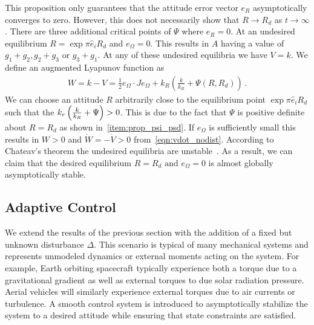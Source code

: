 \documentclass[letterpaper, 10 pt, conference]{ieeeconf}  %
\begin{document}
This proposition only guarantees that the attitude error vector \( e_R \) asymptotically converges to zero.
However, this does not necessarily show that \( R \to R_d \) as \( t \to \infty \). 
There are three additional critical points of \( \Psi \) where \( e_R = 0 \).
At an undesired equilibrium \( R = \exp{\pi \hat{e}_i} R_d \) and \( e_\Omega =0 \). 
This results in \( A \) having a value of \( g_1 + g_2, g_2 + g_3 \) or \( g_3 + g_1 \).
At any of these undesired equilibria we have \( V = k \). 
We define an augmented Lyapunov function as
\begin{align*}
	W = k - V = \frac{1}{2} e_\Omega \cdot J e_\Omega + k_R (\frac{k}{k_R}+ \Psi(R,R_d)) \, .
\end{align*}
We can choose an attitude \( R \) arbitrarily close to the equilibrium point \( \exp{ \pi \hat{e}_i} R_d \) such that the \( k_r \left( \frac{k}{k_R}+\Psi  \right)> 0 \).
This is due to the fact that \( \Psi \) is positive definite about \( R = R_d \) as shown in~\cref{item:prop_psi_psd}.
If \( e_\Omega \) is sufficiently small this results in \( W > 0 \) and \( \dot{W} = -\dot{V} > 0\) from~\cref{eqn:vdot_nodist}.
According to Chateav's theorem the undesired equilibria are unstable~\cite{khalil1996}.
As a result, we can claim that the desired equilibrium \( R = R_d \text{ and } e_\Omega = 0 \) is almost globally asymptotically stable.

\subsection{Adaptive Control}
We extend the results of the previous section with the addition of a fixed but unknown disturbance \( \Delta \).
This scenario is typical of many mechanical systems and represents unmodeled dynamics or external moments acting on the system.
For example, Earth orbiting spacecraft typically experience both a torque due to a gravitational gradient as well as external torques to due solar radiation pressure.
Aerial vehicles will similarly experience external torques due to air currents or turbulence.
A smooth control system is introduced to asymptotically stabilize the system to a desired attitude while ensuring that state constraints are satisfied.
\end{document}
